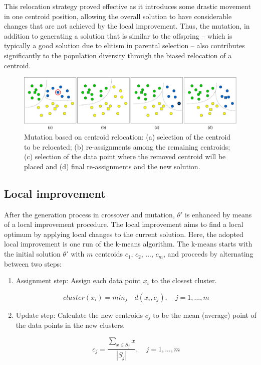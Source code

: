 This relocation strategy proved effective as it introduces some drastic movement in one centroid position, allowing the overall solution to have considerable changes that are not achieved by the local improvement. Thus, the mutation, in addition to generating a solution that is similar to the offspring -- which is typically a good solution due to elitism in parental selection -- also contributes significantly to the population diversity through the biased relocation of a centroid.

\begin{figure}[H]
  \begin{center}
    \includegraphics[width=1.0\textwidth]{img/mutation}
    \caption{Mutation based on centroid relocation: (a) selection of the centroid to be relocated; (b) re-assignments among the remaining centroids; (c) selection of the data point where the removed centroid will be placed and (d) final re-assignments and the new solution.}\label{fig:mutation}
  \end{center}
\end{figure}

\subsection{Local improvement}
\label{subsec:local-improvement}
After the generation process in crossover and mutation, $\theta'$ is enhanced by means of a local improvement procedure. The local improvement aims to find a local optimum by applying local changes to the current solution. Here, the adopted local improvement is one run of the k-means algorithm. The k-means starts with the initial solution $\theta'$ with $m$ centroids $c_1$, $c_2$, ..., $c_m$, and proceeds by alternating between two steps:

\begin{enumerate}

	\item Assignment step: Assign each data point $x_i$ to the closest cluster.
	
	\begin{equation}
	cluster(x_i) = min_j \quad d(x_i, c_j), \quad j = 1,...,m
	\end{equation}
	
	\item Update step: Calculate the new centroids $c_j$ to be the mean (average) point of the data points in the new clusters.
	
	\begin{equation}
	c_j = \frac{\sum_{x \in S_j}x}{\left | S_j \right |}, \quad j = 1,...,m
	\end{equation}
		
\end{enumerate}

